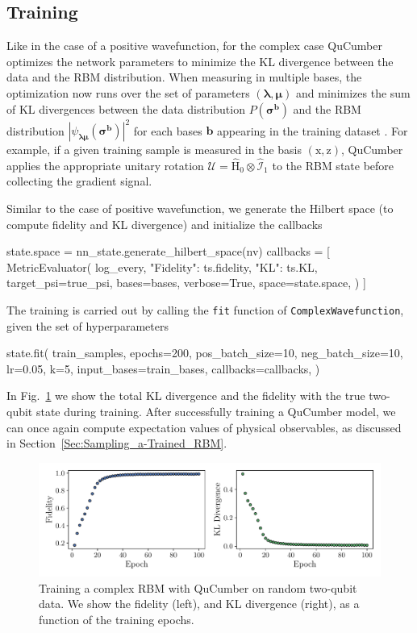 \documentclass[submission, Phys, hidelnks]{SciPost}
\begin{document}
\subsection{Training}
Like in the case of a positive wavefunction, for the complex case
QuCumber optimizes the network parameters to minimize the KL divergence between the data and the RBM distribution. When measuring in multiple bases, the optimization now runs over the set of parameters $(\bm{\lambda},\bm{\mu})$ and minimizes the sum of KL divergences between the data distribution $P(\bm{\sigma}^{\bm{b}})$ and the RBM distribution $|\psi_{\bm{\lambda\mu}}(\bm{\sigma}^{\bm{b}})|^2$ for each bases $\bm{b}$ appearing in the training dataset \cite{torlai_neural-network_2018}. 
For example, if a given training sample is measured in the basis $(\mathrm{x},\mathrm{z})$, QuCumber applies the appropriate unitary rotation $\bm{\mathcal{U}}=\hat{\mathrm{H}}_0\otimes\hat{\mathcal{I}}_1$ to the RBM state before collecting the gradient signal. 

Similar to the case of positive wavefunction, we generate the Hilbert space (to compute fidelity and KL divergence) and initialize the callbacks
\begin{python}
state.space = nn_state.generate_hilbert_space(nv)
callbacks = [
  MetricEvaluator(
    log_every,
    {"Fidelity": ts.fidelity, "KL": ts.KL},
    target_psi=true_psi,
    bases=bases,
    verbose=True,
    space=state.space,
  )
]

\end{python}
The training is carried out by calling the \verb|fit| function of \verb|ComplexWavefunction|, given the set of hyperparameters
\begin{python}
state.fit(
    train_samples,
    epochs=200,
    pos_batch_size=10,
    neg_batch_size=10,
    lr=0.05,
    k=5,
    input_bases=train_bases,
    callbacks=callbacks,
)
\end{python}
In Fig.~\ref{fig:complex} we show the total KL divergence and the fidelity with the true two-qubit state during training. 
After successfully training a QuCumber model, we can once again compute expectation values of physical observables,
as discussed in Section~\ref{Sec:Sampling_a-Trained_RBM}.
\begin{figure}[htb]
    \centering{}
    \includegraphics[width=\textwidth, trim={0 15 0 0}, clip]{complex_fid_KL.pdf}
    \caption{\label{fig:complex} Training a complex RBM with QuCumber on random two-qubit data. We show the fidelity (left), and KL divergence (right), as a function of the training epochs.}
\end{figure}
\end{document}

